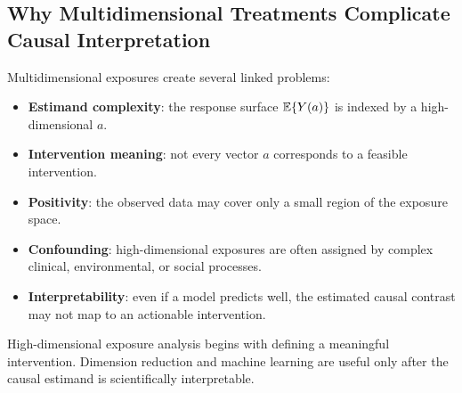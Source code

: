\subsection{Why Multidimensional Treatments Complicate Causal Interpretation}

Multidimensional exposures create several linked problems:
\begin{itemize}
  \item \textbf{Estimand complexity}: the response surface
  $\mathbb{E}\{Y(a)\}$ is indexed by a high-dimensional $a$.
  \item \textbf{Intervention meaning}: not every vector $a$ corresponds to a
  feasible intervention.
  \item \textbf{Positivity}: the observed data may cover only a small region of
  the exposure space.
  \item \textbf{Confounding}: high-dimensional exposures are often assigned by
  complex clinical, environmental, or social processes.
  \item \textbf{Interpretability}: even if a model predicts well, the estimated
  causal contrast may not map to an actionable intervention.
\end{itemize}

\begin{keyidea}
High-dimensional exposure analysis begins with defining a meaningful
intervention. Dimension reduction and machine learning are useful only after the
causal estimand is scientifically interpretable.
\end{keyidea}
